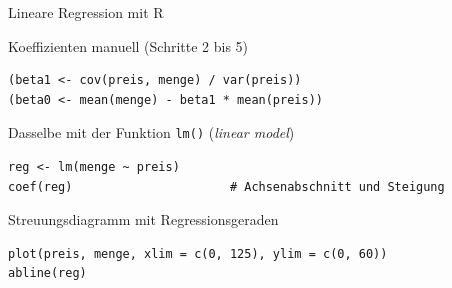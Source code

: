 \documentclass[aspectratio=169,11pt]{beamer}
\begin{document}
\begin{frame}[fragile]{Lineare Regression mit R}
  \begin{block}{Koeffizienten manuell (Schritte 2 bis 5)}
\begin{lstlisting}
(beta1 <- cov(preis, menge) / var(preis))
(beta0 <- mean(menge) - beta1 * mean(preis))
\end{lstlisting}
  \end{block}

  \begin{block}{Dasselbe mit der Funktion \texttt{lm()} (\emph{linear model})}
\begin{lstlisting}
reg <- lm(menge ~ preis)
coef(reg)                      # Achsenabschnitt und Steigung
\end{lstlisting}
  \end{block}

  \begin{block}{Streuungsdiagramm mit Regressionsgeraden}
\begin{lstlisting}
plot(preis, menge, xlim = c(0, 125), ylim = c(0, 60))
abline(reg)
\end{lstlisting}
  \end{block}
\end{frame}
\end{document}

